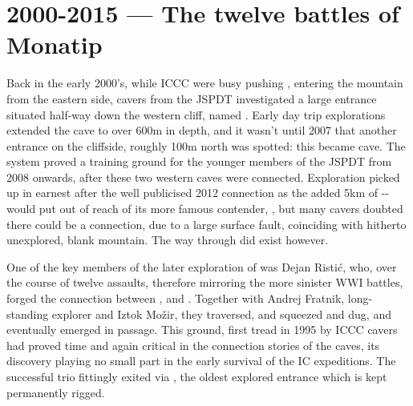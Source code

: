 \section{2000-2015 --- The twelve battles of Monatip}
\label{sec:early primadona}
Back in the early 2000's, while ICCC were busy pushing , entering the mountain from the eastern side, cavers from the JSPDT investigated a large entrance situated half-way down the western cliff, named . Early day trip explorations extended the cave to over 600m in depth, and it wasn't until 2007 that another entrance  on the cliffside, roughly 100m north was spotted: this became  cave. The system proved a training ground for the younger members of the JSPDT from 2008 onwards, after these two western caves were connected. Exploration picked up in earnest after the well publicised 2012 connection as the added 5km of -- would put  out of reach of its more famous contender, , but many cavers doubted there could be a connection, due to a large surface fault, coinciding with hitherto unexplored, blank mountain. The way through did exist however.

One of the key members of the later exploration of  was Dejan Ristić, who, over the course of twelve assaults, therefore mirroring the more sinister WWI  battles, forged the connection between , and . Together with Andrej Fratnik, long-standing  explorer and Iztok Možir, they traversed, and squeezed and dug, and eventually emerged in  passage. This ground, first tread in 1995 by ICCC cavers had proved time and again critical in the connection stories of the  caves, its discovery playing no small part in the early survival of the IC expeditions. The successful trio fittingly exited via , the oldest explored entrance which is kept permanently rigged.

